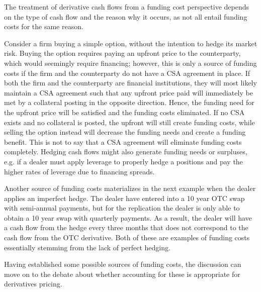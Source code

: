 \documentclass[main.tex]{subfiles}
\begin{document}
        The treatment of derivative cash flows from a funding cost perspective 
        depends on the type of cash flow and the reason why it occurs,
        as not all entail funding costs for the same reason.

        Consider a firm buying a simple option, without the intention to hedge its market risk.
        Buying the option requires paying an upfront price to the counterparty,
        which would seemingly require financing;
        however, this is only a source of funding costs 
        if the firm and the counterparty do not have a CSA agreement in place.
        If both the firm and the counterparty are financial institutions, 
        they will most likely maintain a CSA agreement
        such that any upfront price paid will immediately be met by a collateral posting in the opposite direction.
        Hence, the funding need for the upfront price will be satisfied and the funding costs eliminated.
        If no CSA exists and no collateral is posted, the upfront will still create funding costs,
        while selling the option instead will decrease the funding needs and create a funding benefit.
        This is not to say that a CSA agreement will eliminate funding costs completely. 
        Hedging cash flows might also generate funding needs or surpluses, 
        e.g. if a dealer must apply leverage to properly hedge a positions 
        and pay the higher rates of leverage due to financing spreads.

        Another source of funding costs materializes in the next example when the dealer applies an imperfect hedge.
        The dealer have entered into a 10 year OTC swap with semi-annual payments, 
        but for the replication the dealer is only able to obtain a 10 year swap with quarterly payments.
        As a result, the dealer will have a cash flow from the hedge every three months
        that does not correspond to the cash flow from the OTC derivative. 
        Both of these are examples of funding costs essentially stemming from the lack of perfect hedging.

        Having established some possible sources of funding costs, 
        the discussion can move on to the debate about whether accounting for these is appropriate for derivatives pricing.
\end{document}
